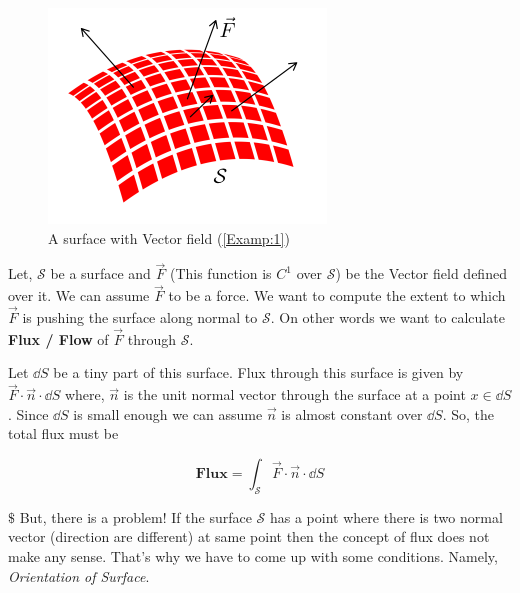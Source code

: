 \documentclass[../Analysis-3]{subfiles}
\begin{document}
\begin{tcolorbox} \label{Examp:1}

    \begin{figure}
        \centering
        \includegraphics[width=.78\linewidth]{../figures/lec-26.3.png}
        \caption{A surface with Vector field (\ref{Examp:1})}
    \end{figure}

    Let, $\mathcal{S}$ be a surface and $\vec{F}$ (This function is $C^1$ over $\mathcal{S}$) be the Vector field defined over it. We can assume $\vec{F}$ to be a force. We want to compute the extent to which $\vec{F}$ is pushing the surface along normal to $\mathcal{S}$. On other words we want to calculate \textbf{Flux / Flow} of $\vec{F}$ through $\mathcal{S}$.

    \vspace{0.2cm}

    Let $\dd S$ be a tiny part of  this surface. Flux through this surface is given by $\vec{F}\cdot\vec{n} \cdot \dd S$ where, $\vec{n}$ is the unit normal vector through the surface at a point $x \in \dd S$. Since $\dd S$ is small enough we can assume $\vec{n}$ is almost constant over $\dd S$. So, the total flux must be

    \[ \textbf{Flux} = \int_{\mathcal{S}} \vec{F}\cdot\vec{n} \cdot \dd S \]

    $\$$ But, there is a problem! If the surface $\mathcal{S}$ has a point where there is two normal vector (direction are different) at same point then the concept of flux does not make any sense. That's why we have to come up with some conditions. Namely, \textit{Orientation of Surface}.

\end{tcolorbox}
\end{document}
